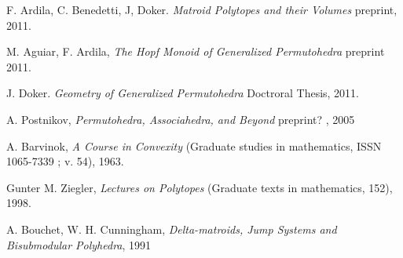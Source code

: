 \documentclass[12pt]{amsart}
\numberwithin{equation}{section}
\begin{document}
\begin{thebibliography}{1}

 F. Ardila, C. Benedetti, J, Doker. {\em Matroid Polytopes and their Volumes} preprint, 2011.

 M. Aguiar, F. Ardila, {\em The Hopf Monoid of Generalized Permutohedra} preprint 2011.


 J. Doker. {\em Geometry of Generalized Permutohedra} Doctroral Thesis, 2011.

 A. Postnikov, {\em Permutohedra, Associahedra, and Beyond} preprint? , 2005

 A. Barvinok, {\em A Course in Convexity} (Graduate studies in mathematics, ISSN 1065-7339 ; v. 54), 1963.

 Gunter M. Ziegler, {\em Lectures on Polytopes} (Graduate texts in mathematics, 152), 1998.

 A. Bouchet, W. H. Cunningham, {\em Delta-matroids, Jump Systems and Bisubmodular Polyhedra}, 1991



\end{thebibliography}
\end{document}
